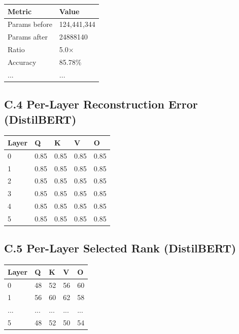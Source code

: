\begin{table}[H]
\centering
\small
\begin{tabular}{ll}
\toprule
\textbf{Metric} & \textbf{Value} \\
\midrule
Params before & 124,441,344 \\
Params after & 24888140 \\
Ratio & 5.0$\times$ \\
Accuracy & 85.78\% \\
... & ... \\
\bottomrule
\end{tabular}
\end{table}

\subsection{C.4 Per-Layer Reconstruction Error (DistilBERT)}

\begin{table}[H]
\centering
\small
\begin{tabular}{lllll}
\toprule
\textbf{Layer} & \textbf{Q} & \textbf{K} & \textbf{V} & \textbf{O} \\
\midrule
0 & 0.85 & 0.85 & 0.85 & 0.85 \\
1 & 0.85 & 0.85 & 0.85 & 0.85 \\
2 & 0.85 & 0.85 & 0.85 & 0.85 \\
3 & 0.85 & 0.85 & 0.85 & 0.85 \\
4 & 0.85 & 0.85 & 0.85 & 0.85 \\
5 & 0.85 & 0.85 & 0.85 & 0.85 \\
\bottomrule
\end{tabular}
\end{table}

\subsection{C.5 Per-Layer Selected Rank (DistilBERT)}

\begin{table}[H]
\centering
\small
\begin{tabular}{lllll}
\toprule
\textbf{Layer} & \textbf{Q} & \textbf{K} & \textbf{V} & \textbf{O} \\
\midrule
0 & 48 & 52 & 56 & 60 \\
1 & 56 & 60 & 62 & 58 \\
... & ... & ... & ... & ... \\
5 & 48 & 52 & 50 & 54 \\
\bottomrule
\end{tabular}
\end{table}


